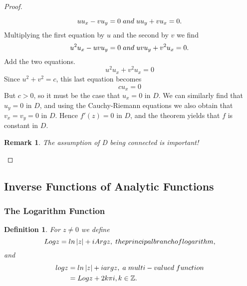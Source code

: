 \documentclass{article}
\newtheorem*{remark}{Remark}
\newtheorem{definition}{Definition}[section]
\begin{document}
\begin{itemize}
\begin{proof}
\begin{itemize}
\begin{equation*}
uu_x - vu_y = 0 \hspace{0.1cm} and \hspace{0.1cm} uu_y + vu_x = 0.
\end{equation*}
Multiplying the first equation by $u$ and the second by $v$ we find
\begin{equation*}
u^2u_x - uvu_y = 0 \hspace{0.1cm} and \hspace{0.1cm} uvu_y + v^2u_x = 0.
\end{equation*}
Add the two equations.
\begin{equation*}
u^2u_x + v^2u_x = 0
\end{equation*}
Since $u^2 + v^2 = c$, this last equation becomes
\begin{equation*}
cu_x = 0
\end{equation*}
But $c > 0$, so it must be the case that $u_x = 0$ in $D$. We can similarly find that $u_y = 0$ in $D$, and using the Cauchy-Riemann equations we also obtain that $v_x = v_y = 0$ in $D$. Hence $f'(z) = 0$ in $D$, and the theorem yields that $f$ is constant in $D$.
\begin{remark}
The assumption of D being connected is important!
\end{remark}
\end{itemize}
\end{proof}
\end{itemize}

\subsection{Inverse Functions of Analytic Functions}
\subsubsection{The Logarithm Function}
\begin{definition}
For $z \neq 0$ we define 
\begin{equation*}
Log z = ln \left|z\right| + i Arg z, \hspace{0.1cm} the principal branch of logarithm,
\end{equation*}
and
\begin{align*}
log z &= ln \left|z\right| + i arg z, \hspace{0.1cm} a \hspace{0.1cm} multi-valued \hspace{0.1cm} function \\
&= Log z + 2k\pi i, k \in \mathbb{Z}.
\end{align*}
\end{definition}
\end{document}
